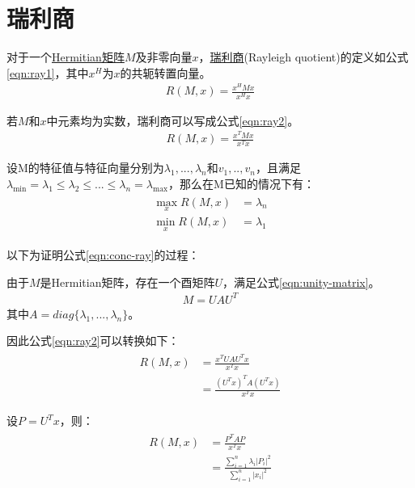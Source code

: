 \section{瑞利商}
\label{sec:rayleigh-quotient}
对于一个\hyperlink{hermitian}{Hermitian矩阵}$M$及非零向量$x$，\href{https://en.wikipedia.org/wiki/Rayleigh_quotient}{瑞利商}(Rayleigh quotient)的定义如公式\ref{eqn:ray1}，其中$x^{H}$为$x$的共轭转置向量。
\begin{align}
\label{eqn:ray1}
R(M,x)=\frac{x^{H}Mx}{x^{H}x}
\end{align}

若$M$和$x$中元素均为实数，瑞利商可以写成公式\ref{eqn:ray2}。
\begin{align}
\label{eqn:ray2}
R(M,x)=\frac{x^{T}Mx}{x^{T}x}
\end{align}

设M的特征值与特征向量分别为$\lambda_1, ..., \lambda_n$和$v_1, .., v_n$，且满足 $\lambda_{\min}=\lambda_1\leq{\lambda_2}\leq{...}\leq{\lambda_n}=\lambda_{\max}$，那么在M已知的情况下有：
\begin{align}
\label{eqn:conc-ray}
\begin{split}
\mathop{\max}_{x}R(M,x) &= \lambda_{n} \\
\mathop{\min}_{x}R(M,x) &= \lambda_{1}
\end{split}
\end{align}

以下为证明公式\ref{eqn:conc-ray}的过程：

由于$M$是Hermitian矩阵，存在一个酉矩阵$U$，满足公式\ref{eqn:unity-matrix}。
\begin{align}
\label{eqn:unity-matrix}
M=UAU^{T}
\end{align}
其中$A=diag\{\lambda_1, ..., \lambda_n\}$。

因此公式\ref{eqn:ray2}可以转换如下：
\begin{align}
\begin{split}
R(M,x) &= \frac{x^{T}UAU^{T}x}{x^{T}x} \\
       &= \frac{(U^{T}x)^{T}A(U^{T}x)}{x^{T}x}  
\end{split}
\end{align}

设$P=U^{T}x$，则：
\begin{align}
\label{eqn:trans1}
\begin{split}
R(M,x) &= \frac{P^{T}AP}{x^{T}x} \\
       &= \frac{\sum_{i=1}^{n}\lambda_{i}|P_i|^{2}}{\sum_{i=1}^{n}|x_i|^{2}}
\end{split}
\end{align}

